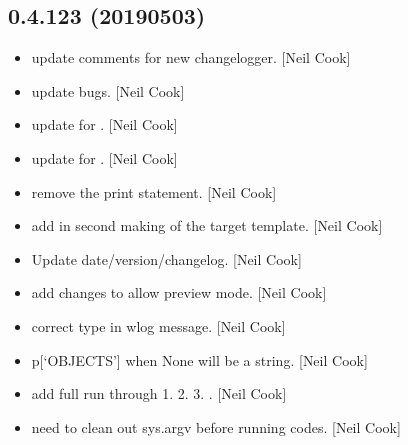 \documentclass[a4paper,10pt,english]{report}
\begin{document}
\subsection{0.4.123 (2019\sphinxhyphen{}05\sphinxhyphen{}03)}
\label{\detokenize{misc/changelog:id157}}\begin{itemize}
\item {} 
 \sphinxhyphen{} update comments for new changelogger. {[}Neil Cook{]}

\item {} 
 \sphinxhyphen{} update bugs. {[}Neil Cook{]}

\item {} 
 \sphinxhyphen{} update for . {[}Neil Cook{]}

\item {} 
 \sphinxhyphen{} update for . {[}Neil Cook{]}

\item {} 
 \sphinxhyphen{} remove the print statement. {[}Neil Cook{]}

\item {} 
 \sphinxhyphen{} add in second making of the target template.
{[}Neil Cook{]}

\item {} 
Update date/version/changelog. {[}Neil Cook{]}

\item {} 
 \sphinxhyphen{} add changes to allow preview mode. {[}Neil Cook{]}

\item {} 
 \sphinxhyphen{} correct type in wlog message. {[}Neil Cook{]}

\item {} 
 \sphinxhyphen{} p{[}‘OBJECTS’{]} when None will be a string. {[}Neil
Cook{]}

\item {} 
 \sphinxhyphen{} add full run through 1.  2. 
3. . {[}Neil Cook{]}

\item {} 
 \sphinxhyphen{} need to clean out sys.argv before running codes.
{[}Neil Cook{]}


\end{itemize}
\end{document}
